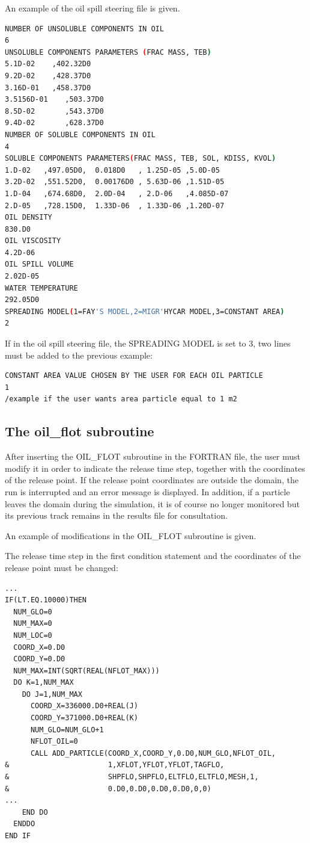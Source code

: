 An example of the oil spill steering file is given.
\begin{lstlisting}[language=bash]
NUMBER OF UNSOLUBLE COMPONENTS IN OIL
6
UNSOLUBLE COMPONENTS PARAMETERS (FRAC MASS, TEB)
5.1D-02    ,402.32D0
9.2D-02    ,428.37D0
3.16D-01   ,458.37D0
3.5156D-01    ,503.37D0
8.5D-02       ,543.37D0
9.4D-02       ,628.37D0
NUMBER OF SOLUBLE COMPONENTS IN OIL 
4
SOLUBLE COMPONENTS PARAMETERS(FRAC MASS, TEB, SOL, KDISS, KVOL)
1.D-02   ,497.05D0,  0.018D0   , 1.25D-05 ,5.0D-05
3.2D-02  ,551.52D0,  0.00176D0 , 5.63D-06 ,1.51D-05
1.D-04   ,674.68D0,  2.0D-04   , 2.D-06   ,4.085D-07
2.D-05   ,728.15D0,  1.33D-06  , 1.33D-06 ,1.20D-07
OIL DENSITY
830.D0
OIL VISCOSITY
4.2D-06
OIL SPILL VOLUME
2.02D-05
WATER TEMPERATURE
292.05D0
SPREADING MODEL(1=FAY'S MODEL,2=MIGR'HYCAR MODEL,3=CONSTANT AREA)
2
\end{lstlisting}
If in the oil spill steering file, the SPREADING MODEL is set to 3, two lines must be added to the previous example:
\begin{lstlisting}[language=bash]
CONSTANT AREA VALUE CHOSEN BY THE USER FOR EACH OIL PARTICLE
1 
/example if the user wants area particle equal to 1 m2
\end{lstlisting}
\subsection{ The oil\_flot subroutine}

 After inserting the OIL\_FLOT subroutine in the FORTRAN file, the user must modify it in order to indicate the release time step, together with the coordinates of the release point. If the release point coordinates are outside the domain, the run is interrupted and an error message is displayed. In addition, if a particle leaves the domain during the simulation, it is of course no longer monitored but its previous track remains in the results file for consultation.

 An example of modifications in the OIL\_FLOT subroutine is given.

 The release time step in the first condition statement and the coordinates of the release point must be changed:
\begin{lstlisting}[language=TelFortran]
...
IF(LT.EQ.10000)THEN
  NUM_GLO=0
  NUM_MAX=0
  NUM_LOC=0
  COORD_X=0.D0
  COORD_Y=0.D0
  NUM_MAX=INT(SQRT(REAL(NFLOT_MAX)))
  DO K=1,NUM_MAX
    DO J=1,NUM_MAX
      COORD_X=336000.D0+REAL(J)
      COORD_Y=371000.D0+REAL(K)
      NUM_GLO=NUM_GLO+1
      NFLOT_OIL=0
      CALL ADD_PARTICLE(COORD_X,COORD_Y,0.D0,NUM_GLO,NFLOT_OIL,
&                       1,XFLOT,YFLOT,YFLOT,TAGFLO,
&                       SHPFLO,SHPFLO,ELTFLO,ELTFLO,MESH,1,
&                       0.D0,0.D0,0.D0,0.D0,0,0)
...
    END DO
  ENDDO
END IF
\end{lstlisting}

